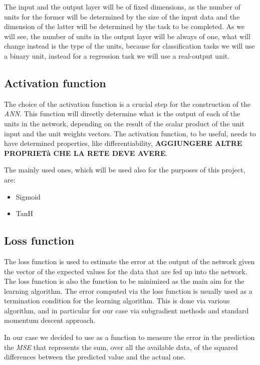The input and the output layer will be of fixed dimensions, as the number of units for the former will be determined by the size of the input data and the dimension of the latter will be determined by the task to be completed. As we will see, the number of units in the output layer will be always of one, what will change instead is the type of the units, because for classification tasks we will use a binary unit, instead for a regression task we will use a real-output unit.

\subsection{Activation function}
The choice of the activation function is a crucial step for the construction of the \textit{ANN}. This function will directly determine what is the output of each of the units in the network, depending on the result of the scalar product of the unit input and the unit weights vectors. The activation function, to be useful, needs to have determined properties, like differentiability, \textbf{AGGIUNGERE ALTRE PROPRIETà CHE LA RETE DEVE AVERE}.\newline

The mainly used ones, which will be used also for the purposes of this project, are:
\begin{itemize}
    \item Sigmoid
    \item TanH
\end{itemize}

\subsection{Loss function}
The loss function is used to estimate the error at the output of the network given the vector of the expected values for the data that are fed up into the network. The loss function is also the function to be minimized as the main aim for the learning algorithm. The error computed via the loss function is usually used as a termination condition for the learning algorithm. This is done via various algorithm, and in particular for our case via subgradient methods and standard momentum descent approach.\newline

In our case we decided to use as a function to measure the error in the prediction the \textit{MSE} that represents the sum, over all the available data, of the squared differences between the predicted value and the actual one.\newline

